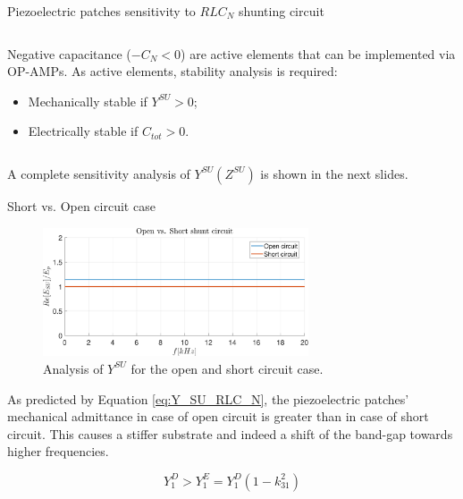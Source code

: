 \begin{frame}{Piezoelectric patches sensitivity to $RLC_N$ shunting circuit}
\begin{columns}[c, onlytextwidth]
\begin{column}{0.65\textwidth}
            \vspace{9pt}

            Negative capacitance ($-C_N < 0$) are active elements that can be implemented via OP-AMPs.
            As active elements, stability analysis is required:

            \begin{itemize}
                \item Mechanically stable if $Y^{SU} > 0$;
                \item Electrically stable if $C_{tot} > 0$.
            \end{itemize}

        \end{column}

    \end{columns}

    \vspace{9pt}

    A complete sensitivity analysis of $Y^{SU}(Z^{SU})$ is shown in the next slides.

\end{frame}



\begin{frame}{Short vs. Open circuit case}

    \begin{figure}[H]
        \centering
        \includegraphics[width=0.7\textwidth]{./img/MATLAB/Y_SU_Open vs Short circuit.pdf}
        \caption{Analysis of $Y^{SU}$ for the open and short circuit case.}
    \end{figure}

    As predicted by Equation \ref{eq:Y_SU_RLC_N}, the piezoelectric patches' mechanical admittance in case of open circuit is greater than in case of short circuit.
    This causes a stiffer substrate and indeed a shift of the band-gap towards higher frequencies.

    \begin{equation}
        Y_1^D > Y_1^E = Y_1^D (1 - k_{31}^2)
    \end{equation}

\end{frame}



